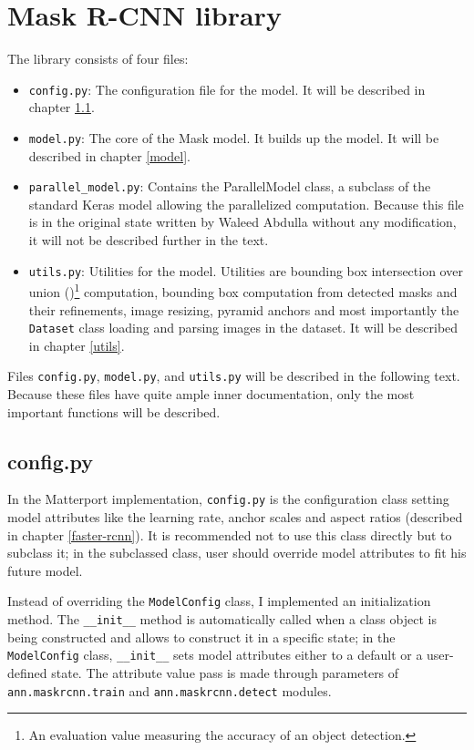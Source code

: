 \section{Mask R-CNN library}
\label{library}

The library consists of four files:
\begin{itemize}
	 \item \verb|config.py|: The configuration file for the model. It will be described in chapter \ref{config}.
	 \item \verb|model.py|: The core of the Mask  model. It builds up the model. It will be described in chapter \ref{model}.
	 \item \verb|parallel_model.py|: Contains the ParallelModel class, a subclass of the standard Keras model allowing the parallelized computation. Because this file is in the original state written by Waleed Abdulla without any modification, it will not be described further in the text.
	 \item \verb|utils.py|: Utilities for the model. Utilities are bounding box intersection over union ()\footnote{An evaluation value measuring the accuracy of an object detection.} computation, bounding box computation from detected masks and their refinements, image resizing, pyramid anchors and most importantly the \verb|Dataset| class loading and parsing images in the dataset. It will be described in chapter \ref{utils}.
\end{itemize}

Files \verb|config.py|, \verb|model.py|, and \verb|utils.py| will be described 
in the following text. Because these files have quite ample inner documentation, 
only the most important functions will be described.

\subsection{config.py}
\label{config}

In the Matterport implementation, \verb|config.py| is the configuration class 
setting model attributes like the learning rate,  anchor scales and 
aspect ratios (described in chapter \ref{faster-rcnn}). It is recommended not to 
use this class directly but to subclass it; in the subclassed class, user should 
override model attributes to fit his future model.

Instead of overriding the \verb|ModelConfig| class, I implemented an 
initialization method. The \verb|__init__| method is automatically called when a 
class object is being constructed and allows to construct it in a specific 
state; in the \verb|ModelConfig| class, \verb|__init__| sets model attributes 
either to a default or a user-defined state. The attribute value pass is made 
through parameters of \verb|ann.maskrcnn.train| and \verb|ann.maskrcnn.detect| 
modules.

